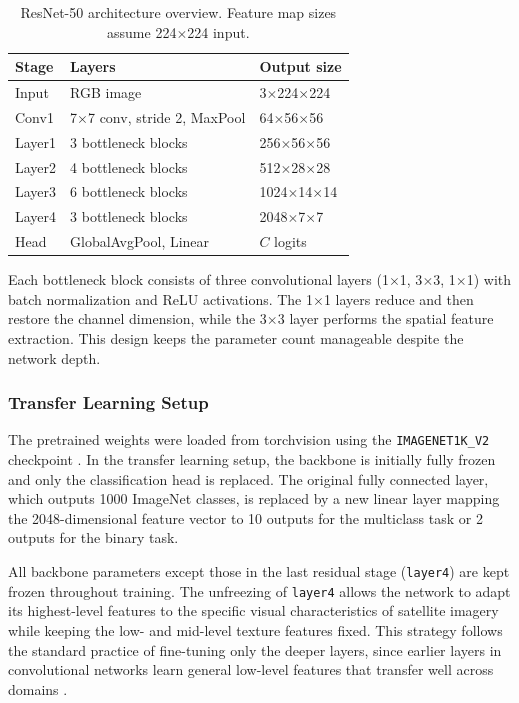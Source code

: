 \begin{table}[H]
\centering
\caption{ResNet-50 architecture overview. Feature map sizes assume 224$\times$224 input.}
\label{tab:resnet_architecture}
\begin{tabularx}{\textwidth}{lXX}
\toprule
Stage & Layers & Output size \\
\midrule
Input   & RGB image                          & 3$\times$224$\times$224 \\
Conv1   & 7$\times$7 conv, stride 2, MaxPool & 64$\times$56$\times$56  \\
Layer1  & 3 bottleneck blocks                & 256$\times$56$\times$56 \\
Layer2  & 4 bottleneck blocks                & 512$\times$28$\times$28 \\
Layer3  & 6 bottleneck blocks                & 1024$\times$14$\times$14 \\
Layer4  & 3 bottleneck blocks                & 2048$\times$7$\times$7  \\
Head    & GlobalAvgPool, Linear              & $C$ logits              \\
\bottomrule
\end{tabularx}
\end{table}

Each bottleneck block consists of three convolutional layers (1$\times$1, 3$\times$3,
1$\times$1) with batch normalization and ReLU activations. The 1$\times$1 layers
reduce and then restore the channel dimension, while the 3$\times$3 layer performs
the spatial feature extraction. This design keeps the parameter count manageable
despite the network depth.

\subsubsection{Transfer Learning Setup}

The pretrained weights were loaded from torchvision using the
\texttt{IMAGENET1K\_V2} checkpoint \cite{torchvision}. In the transfer learning
setup, the backbone is initially fully frozen and only the classification head is
replaced. The original fully connected layer, which outputs 1000 ImageNet
classes, is replaced by a new linear layer mapping the 2048-dimensional feature
vector to 10 outputs for the multiclass task or 2 outputs for the binary task.

All backbone parameters except those in the last residual stage (\texttt{layer4})
are kept frozen throughout training. The unfreezing of \texttt{layer4} allows the
network to adapt its highest-level features to the specific visual characteristics
of satellite imagery while keeping the low- and mid-level texture features fixed.
This strategy follows the standard practice of fine-tuning only the deeper layers,
since earlier layers in convolutional networks learn general low-level features
that transfer well across domains \cite{yosinski2014transferable}.

